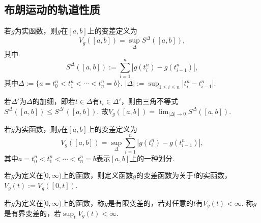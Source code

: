 \documentclass[lang=cn,10pt,thmcnt=section]{elegantbook}
\begin{document}
\subsection{布朗运动的轨道性质}
\begin{definition}
	若$g$为实函数，则$g$在$[a,b]$上的变差定义为
\[
V_g([a,b]) = \sup_{\Delta} S^{\Delta}([a,b]),
\]
其中
\[
S^{\Delta}([a,b]) := \sum_{i=1}^{n} |g(t_i^n) - g(t_{i-1}^n)|,
\]
其中$\Delta := \{a = t_0^n < t_1^n < \cdots < t_n^n = b\}$. $|\Delta| := \sup_{1 \leq i \leq n} |t_i^n - t_{i-1}^n|$.
\end{definition}
若$\Delta'$为$\Delta$的加细，即若$t \in \Delta$有$t_i \in \Delta'$，则由三角不等式$S^{\Delta}([a,b]) \leq S^{\Delta'}([a,b])$. 故$V_g([a,b]) = \lim_{|\Delta| \to 0} S^{\Delta}([a,b])$.
\begin{definition}
	若$g$为实函数，则$g$在$[a,b]$上的变差定义为
\[
V_g([a,b]) = \sup_{\Delta} \sum_{i=1}^{n} |g(t_i^n) - g(t_{i-1}^n)|,
\]
其中$a = t_0^n < t_1^n < \cdots < t_n^n = b$表示$[a,b]$上的一种划分.

若$g$为定义在$[0, \infty)$上的函数，则定义函数$g$的变差函数为关于$t$的实函数，$V_g(t) := V_g([0,t])$.
\end{definition}
\begin{definition}
	若$g$为定义在$[0, \infty)$上的函数，称$g$是有限变差的，若对任意的$t$有$V_g(t) < \infty$. 称$g$是有界变差的，若$\sup_{t} V_g(t) < \infty$.
\end{definition}
\end{document}
